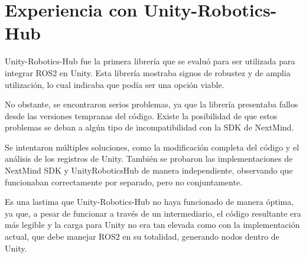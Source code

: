 \section{Experiencia con Unity-Robotics-Hub}

Unity-Robotics-Hub fue la primera librería que se evaluó para ser utilizada para integrar ROS2 en Unity. Esta librería mostraba signos de robustez y de amplia utilización, lo cual indicaba que podía ser una opción viable.



No obstante, se encontraron serios problemas, ya que la librería presentaba fallos desde las versiones tempranas del código. Existe la posibilidad de que estos problemas se deban a algún tipo de incompatibilidad con la SDK de NextMind.



Se intentaron múltiples soluciones, como la modificación completa del código y el análisis de los registros de Unity. También se probaron las implementaciones de NextMind SDK y UnityRoboticsHub de manera independiente, observando que funcionaban correctamente por separado, pero no conjuntamente.



Es una lastima que Unity-Robotics-Hub no haya funcionado de manera óptima, ya que, a pesar de funcionar a través de un intermediario, el código resultante era más legible y la carga para Unity no era tan elevada como con la implementación actual, que debe manejar ROS2 en su totalidad, generando nodos dentro de Unity.
